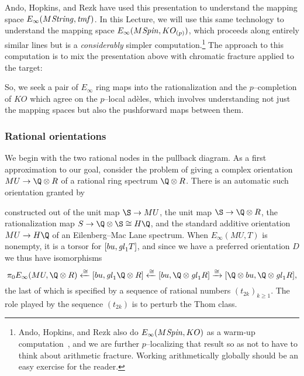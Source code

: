 Ando, Hopkins, and Rezk have used this presentation to understand the mapping space $E_\infty(M\mathit{String}, \mathit{tmf})$.  In this Lecture, we will use this same technology to understand the mapping space $E_\infty(M\mathit{Spin}, KO_{(p)})$, which proceeds along entirely similar lines but is a \emph{considerably} simpler computation.\footnote{Ando, Hopkins, and Rezk also do $E_\infty(M\mathit{Spin}, KO)$ as a warm-up computation~\cite[Section 7]{AHR}, and we are further $p$--localizing that result so as not to have to think about arithmetic fracture.  Working arithmetically globally should be an easy exercise for the reader.}  The approach to this computation is to mix the presentation above with chromatic fracture applied to the target:
\begin{center}
\end{center}
So, we seek a pair of $E_\infty$ ring maps into the rationalization and the $p$--completion of $KO$ which agree on the $p$--local ad\`eles, which involves understanding not just the mapping spaces but also the pushforward maps between them.





\subsubsection{Rational orientations}

We begin with the two rational nodes in the pullback diagram.  As a first approximation to our goal, consider the problem of giving a complex orientation $MU \to \Q \otimes R$ of a rational ring spectrum $\Q \otimes R$.  There is an automatic such orientation granted by
\begin{center}
\end{center}
constructed out of the unit map $\S \to MU$, the unit map $\S \to \Q \otimes R$, the rationalization map $S \to \Q \otimes \S \cong H\Q$, and the standard additive orientation $MU \to H\Q$ of an Eilenberg--Mac Lane spectrum.  When $E_\infty(MU, T)$ is nonempty, it is a torsor for $[bu, \mathit{gl}_1 T]$, and since we have a preferred orientation $D$ we thus have isomorphisms \[\pi_0 E_\infty(MU, \Q \otimes R) \xleftarrow{\cong} [bu, \gl_1 \Q \otimes R] \xleftarrow{\cong} [bu, \Q \otimes \gl_1 R] \xrightarrow{\cong} [\Q \otimes bu, \Q \otimes \gl_1 R],\] the last of which is specified by a sequence of rational numbers $(t_{2k})_{k \ge 1}$.  The role played by the sequence $(t_{2k})$ is to perturb the Thom class.

